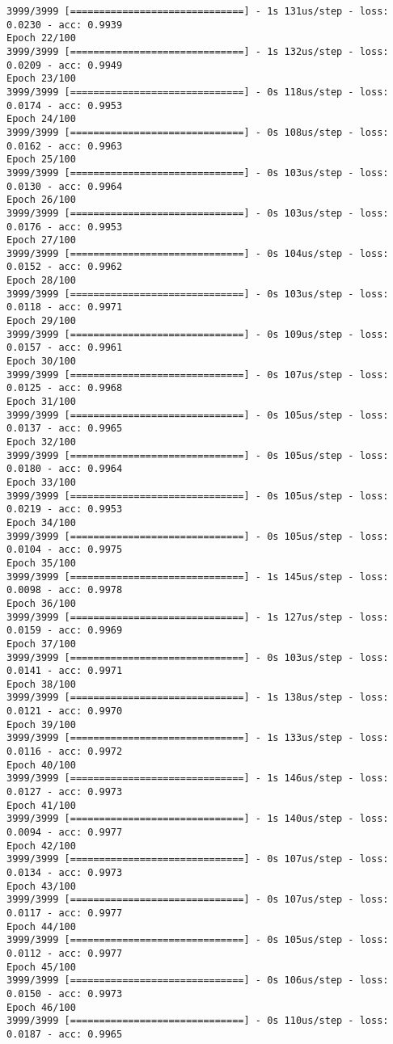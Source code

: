 \documentclass[11pt]{article}
\begin{document}
\begin{Verbatim}[commandchars=\\\{\}]
3999/3999 [==============================] - 1s 131us/step - loss: 0.0230 - acc: 0.9939
Epoch 22/100
3999/3999 [==============================] - 1s 132us/step - loss: 0.0209 - acc: 0.9949
Epoch 23/100
3999/3999 [==============================] - 0s 118us/step - loss: 0.0174 - acc: 0.9953
Epoch 24/100
3999/3999 [==============================] - 0s 108us/step - loss: 0.0162 - acc: 0.9963
Epoch 25/100
3999/3999 [==============================] - 0s 103us/step - loss: 0.0130 - acc: 0.9964
Epoch 26/100
3999/3999 [==============================] - 0s 103us/step - loss: 0.0176 - acc: 0.9953
Epoch 27/100
3999/3999 [==============================] - 0s 104us/step - loss: 0.0152 - acc: 0.9962
Epoch 28/100
3999/3999 [==============================] - 0s 103us/step - loss: 0.0118 - acc: 0.9971
Epoch 29/100
3999/3999 [==============================] - 0s 109us/step - loss: 0.0157 - acc: 0.9961
Epoch 30/100
3999/3999 [==============================] - 0s 107us/step - loss: 0.0125 - acc: 0.9968
Epoch 31/100
3999/3999 [==============================] - 0s 105us/step - loss: 0.0137 - acc: 0.9965
Epoch 32/100
3999/3999 [==============================] - 0s 105us/step - loss: 0.0180 - acc: 0.9964
Epoch 33/100
3999/3999 [==============================] - 0s 105us/step - loss: 0.0219 - acc: 0.9953
Epoch 34/100
3999/3999 [==============================] - 0s 105us/step - loss: 0.0104 - acc: 0.9975
Epoch 35/100
3999/3999 [==============================] - 1s 145us/step - loss: 0.0098 - acc: 0.9978
Epoch 36/100
3999/3999 [==============================] - 1s 127us/step - loss: 0.0159 - acc: 0.9969
Epoch 37/100
3999/3999 [==============================] - 0s 103us/step - loss: 0.0141 - acc: 0.9971
Epoch 38/100
3999/3999 [==============================] - 1s 138us/step - loss: 0.0121 - acc: 0.9970
Epoch 39/100
3999/3999 [==============================] - 1s 133us/step - loss: 0.0116 - acc: 0.9972
Epoch 40/100
3999/3999 [==============================] - 1s 146us/step - loss: 0.0127 - acc: 0.9973
Epoch 41/100
3999/3999 [==============================] - 1s 140us/step - loss: 0.0094 - acc: 0.9977
Epoch 42/100
3999/3999 [==============================] - 0s 107us/step - loss: 0.0134 - acc: 0.9973
Epoch 43/100
3999/3999 [==============================] - 0s 107us/step - loss: 0.0117 - acc: 0.9977
Epoch 44/100
3999/3999 [==============================] - 0s 105us/step - loss: 0.0112 - acc: 0.9977
Epoch 45/100
3999/3999 [==============================] - 0s 106us/step - loss: 0.0150 - acc: 0.9973
Epoch 46/100
3999/3999 [==============================] - 0s 110us/step - loss: 0.0187 - acc: 0.9965

\end{Verbatim}
\end{document}
